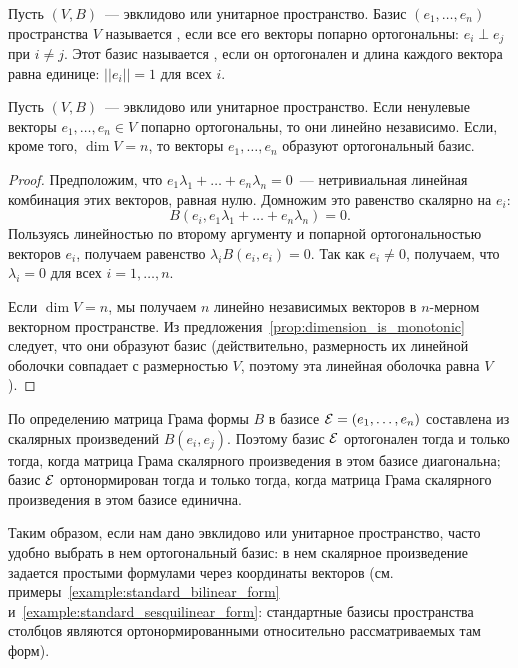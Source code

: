
\begin{definition}
Пусть $(V,B)$~--- эвклидово или унитарное пространство.
Базис $(e_1,\dots,e_n)$ пространства $V$ называется
, если все его векторы
попарно ортогональны:
$e_i\perp e_j$ при $i\neq j$. Этот базис называется
, если он
ортогонален и длина каждого вектора равна единице: $||e_i||=1$ для
всех $i$.
\end{definition}

\begin{lemma}\label{lem:orthogonality_implies_independency}
Пусть $(V,B)$~--- эвклидово или унитарное пространство. Если ненулевые
векторы $e_1,\dots,e_n\in V$ попарно ортогональны,
то они линейно независимо. Если, кроме того, $\dim V=n$, то векторы
$e_1,\dots,e_n$ образуют ортогональный базис.
\end{lemma}
\begin{proof}
Предположим, что $e_1\lambda_1 + \dots +
e_n\lambda_n = 0$~--- нетривиальная линейная комбинация этих векторов,
равная нулю. Домножим это равенство скалярно на $e_i$:
$$
B(e_i,e_1\lambda_1 + \dots + e_n\lambda_n) = 0.
$$
Пользуясь линейностью по второму аргументу и попарной ортогональностью
векторов $e_i$, получаем равенство $\lambda_i B(e_i,e_i) = 0$. Так как
$e_i\neq 0$, получаем, что $\lambda_i=0$ для всех $i=1,\dots,n$.

Если $\dim V = n$, мы получаем $n$ линейно независимых векторов в
$n$-мерном векторном пространстве. Из
предложения~\ref{prop:dimension_is_monotonic} следует, что они
образуют базис (действительно, размерность их линейной оболочки
совпадает с размерностью $V$, поэтому эта линейная оболочка равна $V$).
\end{proof}

\begin{remark}
По определению матрица Грама формы $B$ в базисе $\mathcal E =
(e_1,\dots,e_n)$ составлена из
скалярных произведений $B(e_i,e_j)$. Поэтому базис $\mathcal E$
ортогонален тогда и только тогда, когда матрица Грама скалярного
произведения в этом базисе диагональна; базис $\mathcal E$ ортонормирован
тогда и только тогда, когда матрица Грама скалярного произведения в
этом базисе единична.
\end{remark}

Таким образом, если нам дано эвклидово или унитарное пространство,
часто удобно выбрать в нем ортогональный базис: в нем скалярное
произведение задается простыми формулами через координаты векторов
(см. примеры~\ref{example:standard_bilinear_form}
и~\ref{example:standard_sesquilinear_form}: стандартные базисы
пространства столбцов являются ортонормированными относительно
рассматриваемых там форм).

